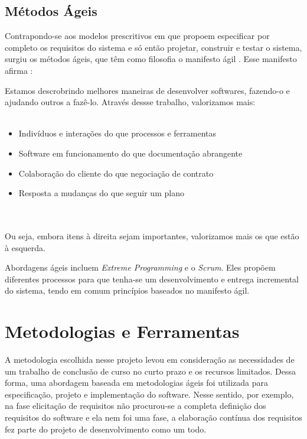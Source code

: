 \subsection{Métodos Ágeis}

Contrapondo-se aos modelos prescritivos em que propoem especificar por completo
os requisitos do sistema e só então projetar, construir e testar o sistema, surgiu
os métodos ágeis, que têm como filosofia o manifesto ágil \cite{Sommerville2006}.
Esse manifesto afirma \cite{agilemanifesto}:

\begin{citacao}
  Estamos descrobrindo melhores maneiras de desenvolver softwares, fazendo-o e ajudando
  outros a fazê-lo. Através dessse trabalho, valorizamos mais:\\\\
  \begin{minipage}{15cm}
    \begin{itemize}
      \item Indivíduos e interações do que processos e ferramentas
      \item Software em funcionamento do que documentação abrangente
      \item Colaboração do cliente do que negociação de contrato
      \item Resposta a mudanças do que seguir um plano
    \end{itemize}
  \end{minipage}\\\\
  Ou seja, embora itens à direita sejam importantes, valorizamos mais os que estão à esquerda.
\end{citacao}

Abordagens ágeis incluem \textit{Extreme Programming} e o \textit{Scrum}. Eles propõem diferentes processos
para que tenha-se um desenvolvimento e entrega incremental do sistema, tendo em comum princípios
baseados no manifesto ágil.

\section{Metodologias e Ferramentas}

A metodologia escolhida nesse projeto levou em consideração as necessidades de um trabalho de
conclusão de curso no curto prazo e os recursos limitados. Dessa forma, uma abordagem baseada em metodologias ágeis foi utilizada para %
especificação, projeto e implementação do software. Nesse sentido, por exemplo,
na fase elicitação de requisitos não procurou-se a completa definição dos requisitos do software e ela nem foi
uma fase, a elaboração contínua dos requisitos fez parte do projeto de desenvolvimento como um todo.

